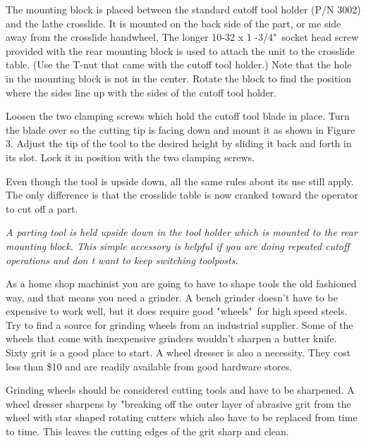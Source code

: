 The mounting block is placed between the standard cutoff tool holder (P/N 3002)
and the lathe crosslide. It is mounted on the back side of the part, or me side
away from the crosslide handwheel, The longer 10-32 x 1 -3/4"\ socket head screw
provided with the rear mounting block is used to attach the unit to the
crosslide table. (Use the T-nut that came with the cutoff tool holder.) Note
that the hole in the mounting block is not in the center. Rotate the block to
find the position where the sides line up with the sides of the cutoff tool
holder.

Loosen the two clamping screws which hold the cutoff tool blade in place. Turn
the blade over so the cutting tip is facing down and mount it as shown in Figure
3. Adjust the tip of the tool to the desired height by sliding it back and forth
in its slot. Lock it in position with the two clamping screws.

Even though the tool is upside down, all the same rules about its use still
apply. The only difference is that the crosslide table is now cranked toward the
operator to cut off a part.

\bigskip
\textit{A parting tool is held upside down in the tool holder which is mounted
to the rear mounting block. This simple accessory is helpful if you are doing
repeated cutoff operations and don t want to keep switching toolposts.}
\bigskip

\secup

\secdown

As a home shop machinist you are going to have to shape tools the old fashioned
way, and that means you need a grinder. A bench grinder doesn't have to be
expensive to work well, but it does require good "wheels"\ for high speed steels.
Try to find a source for grinding wheels from an industrial supplier. Some of
the wheels that come with inexpensive grinders wouldn't sharpen a butter knife.
Sixty grit is a good place to start. A wheel dresser is also a necessity. They
cost less than \$10 and are readily available from good hardware stores.


Grinding wheels should be considered cutting tools and have to be sharpened. A
wheel dresser sharpens by "breaking off the outer layer of abrasive grit from
the wheel with star shaped rotating cutters which also have to be replaced from
time to time. This leaves the cutting edges of the grit sharp and clean.

